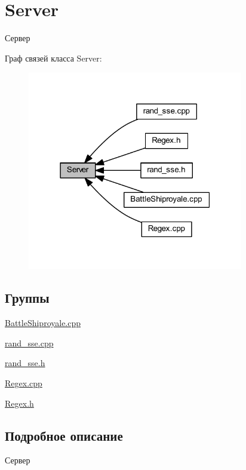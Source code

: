 \hypertarget{group__server}{}\section{Server}
\label{group__server}


Сервер  


Граф связей класса Server\+:\nopagebreak
\begin{figure}[H]
\begin{center}
\leavevmode
\includegraphics[width=267pt]{group__server}
\end{center}
\end{figure}
\subsection*{Группы}
\begin{DoxyCompactItemize}
\item 
\mbox{\hyperlink{group__battleshiproyalecpp}{Battle\+Shiproyale.\+cpp}}
\item 
\mbox{\hyperlink{group__rand__ssecpp}{rand\+\_\+sse.\+cpp}}
\item 
\mbox{\hyperlink{group__rand__sseh}{rand\+\_\+sse.\+h}}
\item 
\mbox{\hyperlink{group__regexcpp}{Regex.\+cpp}}
\item 
\mbox{\hyperlink{group__regexh}{Regex.\+h}}
\end{DoxyCompactItemize}


\subsection{Подробное описание}
Сервер 

